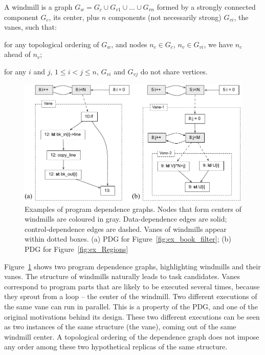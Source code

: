 \documentclass[sigplan,10pt,review,anonymous]{acmart}
\begin{document}
\begin{definition}
\label{def:windmill}
A windmill is a graph $G_w = G_c \cup G_{v1} \cup \ldots \cup G_{vn}$ formed by
a strongly connected component $G_c$, its center, plus $n$ components (not
necessarily strong) $G_{vi}$, the vanes, such that:
\begin{compactenum}
\item for any topological ordering of $G_w$, and nodes $n_c \in G_c$,
$n_v \in G_{vi}$, we have $n_c$ ahead of $n_v$;
\item for any $i$ and $j$, $1 \leq i < j \leq n$, $G_{vi}$ and $G_{vj}$ do not
share vertices.
\end{compactenum}
\end{definition}


\begin{figure}[h]
\begin{center}
\includegraphics[width=1\columnwidth]{images/ex_windmill}
\caption{Examples of program dependence graphs.
Nodes that form centers of windmills are coloured in gray.
Data-dependence edges are solid; control-dependence edges are dashed.
Vanes of windmills appear within dotted boxes.
(a) PDG for Figure~\ref{fig:ex_book_filter};
(b) PDG for Figure~\ref{fig:ex_Regions}}
\label{fig:ex_windmill}
\end{center}
\end{figure}

Figure~\ref{fig:ex_windmill} shows two program dependence graphs, highlighting
windmills and their vanes.
The structure of windmills naturally leads to task candidates.
Vanes correspond to program parts that are likely to be executed
several times, because they sprout from a loop -- the center of the windmill.
Two different executions of the same vane can run in parallel.
This is a property of the PDG, and one of the original motivations behind its
design.
These two different executions can be seen as two instances of the same
structure (the vane), coming out of the same windmill center.
A topological ordering of the dependence graph does not impose any order among
these two hypothetical replicas of the same structure.
\end{document}

